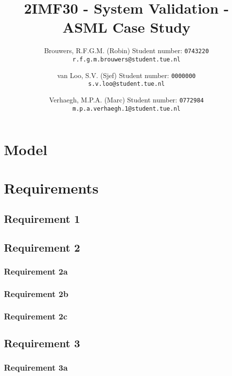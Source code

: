 \documentclass[a4paper]{article}
\title{2IMF30 - System Validation - ASML Case Study}
\author{
    Brouwers, R.F.G.M. (Robin) \qquad Student number: \texttt{0743220} \\
    \texttt{r.f.g.m.brouwers@student.tue.nl}
    \and
    van Loo, S.V. (Sjef) \qquad Student number: \texttt{0000000} \\
    \texttt{s.v.loo@student.tue.nl}
    \and
    Verhaegh, M.P.A. (Marc) \qquad Student number: \texttt{0772984} \\
    \texttt{m.p.a.verhaegh.1@student.tue.nl}
}
\begin{document}
    \maketitle
    
    
    
    
    
    

    \appendix
    \section{Model}
    
    
    \section{Requirements}
    \subsection{Requirement 1}
    
    
    \subsection{Requirement 2}
    \subsubsection{Requirement 2a}
    
    
    \subsubsection{Requirement 2b}
    
    
    \subsubsection{Requirement 2c}
    
    
    \subsection{Requirement 3}
    \subsubsection{Requirement 3a}
    
    
\end{document}
